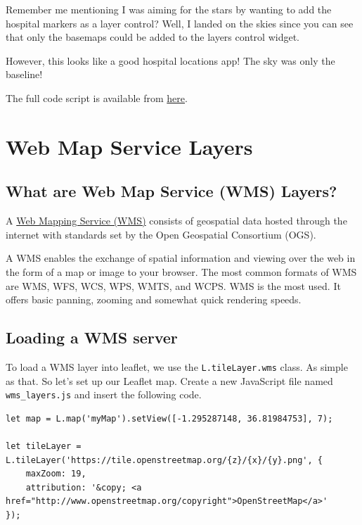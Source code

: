 \documentclass[
]{book}
\begin{document}
Remember me mentioning I was aiming for the stars by wanting to add the hospital markers as a layer control? Well, I landed on the skies since you can see that only the basemaps could be added to the layers control widget.

However, this looks like a good hospital locations app! The sky was only the baseline!

The full code script is available from \href{https://www.dropbox.com/scl/fo/lu6xoy9vcwrtruc838e29/h?dl=0\&rlkey=suuajpnxon0axc7y4r5s3yh0f}{here}.

\hypertarget{web-map-service-layers}{%
\chapter{Web Map Service Layers}\label{web-map-service-layers}}

\hypertarget{what-are-web-map-service-wms-layers}{%
\section{What are Web Map Service (WMS) Layers?}\label{what-are-web-map-service-wms-layers}}

A \href{https://gisgeography.com/web-mapping-services-wms/}{Web Mapping Service (WMS)} consists of geospatial data hosted through the internet with standards set by the Open Geospatial Consortium (OGS).

A WMS enables the exchange of spatial information and viewing over the web in the form of a map or image to your browser. The most common formats of WMS are WMS, WFS, WCS, WPS, WMTS, and WCPS. WMS is the most used. It offers basic panning, zooming and somewhat quick rendering speeds.

\hypertarget{loading-a-wms-server}{%
\section{Loading a WMS server}\label{loading-a-wms-server}}

To load a WMS layer into leaflet, we use the \texttt{L.tileLayer.wms} class. As simple as that. So let's set up our Leaflet map. Create a new JavaScript file named \texttt{wms\_layers.js} and insert the following code.

\begin{verbatim}
let map = L.map('myMap').setView([-1.295287148, 36.81984753], 7);

let tileLayer = L.tileLayer('https://tile.openstreetmap.org/{z}/{x}/{y}.png', {
    maxZoom: 19,
    attribution: '&copy; <a href="http://www.openstreetmap.org/copyright">OpenStreetMap</a>'
});
\end{verbatim}
\end{document}
